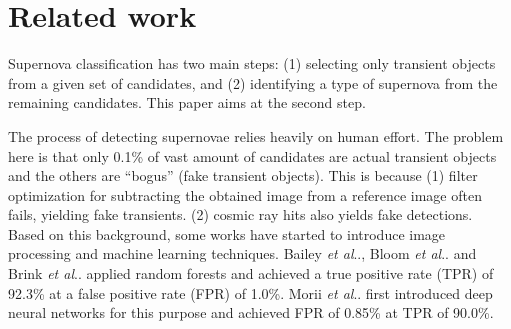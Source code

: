 \documentclass[conference,compsoc]{IEEEtran}
\makeatletter
\DeclareRobustCommand\onedot{\futurelet\@let@token\@onedot}
\def\@onedot{\ifx\@let@token.\else.\null\fi\xspace}
\def\etal{\emph{et al}\onedot}
\makeatother
\begin{document}


\section{Related work}
\label{sec:related}

  Supernova classification has two main steps:
  (1) selecting only transient objects from a given set of candidates, and
  (2) identifying a type of supernova from the remaining candidates.
  This paper aims at the second step. %

  The process of detecting supernovae relies heavily on human effort.
  The problem here is that only 0.1\% of vast amount of candidates are actual transient objects and the others are ``bogus'' (fake transient objects).
  This is because
  (1) filter optimization for subtracting the obtained image from a reference image often fails, yielding fake transients.
  (2) cosmic ray hits also yields fake detections.
  Based on this background, some works have started to introduce image processing and machine learning techniques.
  Bailey \etal \cite{Bailey2007}, Bloom \etal \cite{Bloom2012} and Brink \etal \cite{Brink2013} applied random forests and achieved a true positive rate (TPR) of 92.3\% at a false positive rate (FPR) of 1.0\%.
  Morii \etal \cite{Morii2016} first introduced deep neural networks for this purpose and achieved FPR of 0.85\% at TPR of 90.0\%.
\end{document}
